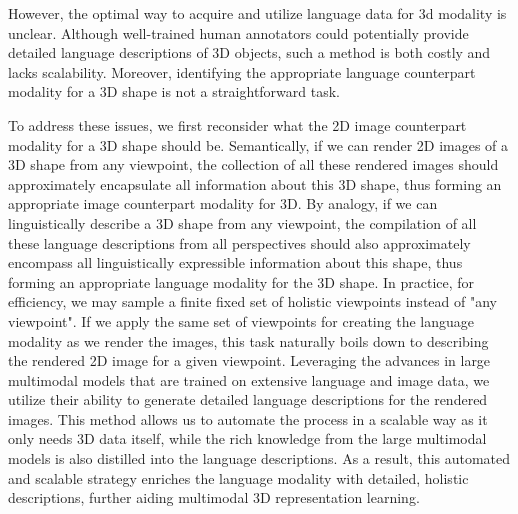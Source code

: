 \documentclass[10pt,twocolumn,letterpaper]{article}
\newcommand{\JN}[1]{\textcolor{purple}{[junnan: #1]}}
\begin{document}
However, the optimal way to acquire and utilize language data for 3d modality is unclear. Although well-trained human annotators could potentially provide detailed language descriptions of 3D objects, such a method is both costly and lacks scalability. Moreover, identifying the appropriate language counterpart modality for a 3D shape is not a straightforward task.

To address these issues, we first reconsider what the 2D image counterpart modality for a 3D shape should be. Semantically, if we can render 2D images of a 3D shape from any viewpoint,  the collection of all these rendered images should approximately encapsulate all information about this 3D shape, thus forming an appropriate image counterpart modality for 3D. By analogy, if we can linguistically describe a 3D shape from any viewpoint,  the compilation of all these language descriptions from all perspectives should also approximately encompass all linguistically expressible information about this shape, thus forming an appropriate language modality for the 3D shape.
In practice, for efficiency, we may sample a finite fixed set of holistic viewpoints instead of "any viewpoint". If we apply the same set of viewpoints for creating the language modality as we render the images, this task naturally boils down to describing the rendered 2D image for a given viewpoint. Leveraging the advances in large multimodal models that are trained on extensive language and image data, we utilize their ability to generate detailed language descriptions for the rendered images. This method allows us to automate the process in a scalable way as it only needs 3D data itself, while the rich knowledge from the large multimodal models is also distilled into the language descriptions. As a result, this automated and scalable strategy enriches the language modality with detailed, holistic descriptions, further aiding multimodal 3D representation learning.

\end{document}
